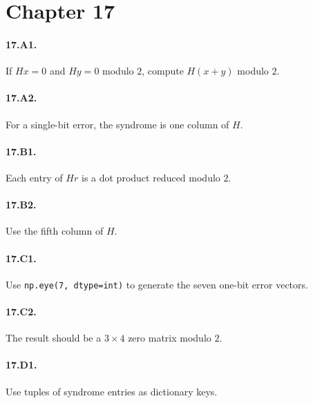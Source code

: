 \section*{Chapter 17}

\paragraph{17.A1.}
If $Hx=0$ and $Hy=0$ modulo $2$, compute $H(x+y)$ modulo $2$.

\paragraph{17.A2.}
For a single-bit error, the syndrome is one column of $H$.

\paragraph{17.B1.}
Each entry of $Hr$ is a dot product reduced modulo $2$.

\paragraph{17.B2.}
Use the fifth column of $H$.

\paragraph{17.C1.}
Use \texttt{np.eye(7, dtype=int)} to generate the seven one-bit error vectors.

\paragraph{17.C2.}
The result should be a $3\times 4$ zero matrix modulo $2$.

\paragraph{17.D1.}
Use tuples of syndrome entries as dictionary keys.
